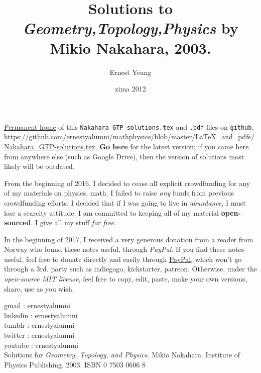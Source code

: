 \documentclass[twoside]{amsart}
\title{
Solutions to \emph{Geometry,Topology,Physics} by Mikio Nakahara, 2003.  
}
\author{
  Ernest Yeung
       }
\date{zima 2012}
\begin{document}

\maketitle

\href{https://github.com/ernestyalumni/mathphysics/blob/master/LaTeX_and_pdfs/Nakahara_GTP-solutions.tex}{Permanent home} of this \verb|Nakahara GTP-solutions.tex| and \verb|.pdf| files on \verb|github|, \url{https://github.com/ernestyalumni/mathphysics/blob/master/LaTeX_and_pdfs/Nakahara_GTP-solutions.tex}.  \textbf{Go here} for the latest version; if you came here from anywhere else (such as Google Drive), then the version of solutions most likely will be outdated.  

From the beginning of 2016, I decided to cease all explicit crowdfunding for any of my materials on physics, math.  I failed to raise \emph{any} funds from previous crowdfunding efforts.  I decided that if I was going to live in \emph{abundance}, I must lose a scarcity attitude.  I am committed to keeping all of my material \textbf{open-sourced}.  I give all my stuff \emph{for free}.   

In the beginning of 2017, I received a very generous donation from a reader from Norway who found these notes useful, through \emph{PayPal}.  If you find these notes useful, feel free to donate directly and easily through \href{https://www.paypal.com/cgi-bin/webscr?cmd=_donations&business=ernestsaveschristmas%2bpaypal%40gmail%2ecom&lc=US&item_name=ernestyalumni&currency_code=USD&bn=PP%2dDonationsBF%3abtn_donateCC_LG%2egif%3aNonHosted}{PayPal}, which won't go through a 3rd. party such as indiegogo, kickstarter, patreon.  Otherwise, under the \emph{open-source MIT license}, feel free to copy, edit, paste, make your own versions, share, use as you wish.    

\noindent gmail        : ernestyalumni \\
linkedin     : ernestyalumni \\
tumblr       : ernestyalumni \\
twitter      : ernestyalumni \\
youtube      : ernestyalumni \\



Solutions for \emph{Geometry, Topology, and Physics}.  Mikio Nakahara.  Institute of Physics Publishing.  2003.  ISBN 0 7503 0606 8
\end{document}
